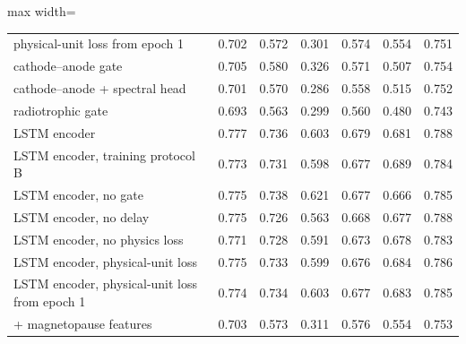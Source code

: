 \begin{table}[!t]
\begin{adjustbox}{max width=\linewidth}
\begin{tabular}{lcccccc}
\quad physical-unit loss from epoch 1 & 0.702 & 0.572 & 0.301 & 0.574 & 0.554 & 0.751 \\
\quad cathode--anode gate & 0.705 & 0.580 & 0.326 & 0.571 & 0.507 & 0.754 \\
\quad cathode--anode + spectral head & 0.701 & 0.570 & 0.286 & 0.558 & 0.515 & 0.752 \\
\quad radiotrophic gate & 0.693 & 0.563 & 0.299 & 0.560 & 0.480 & 0.743 \\
\quad LSTM encoder & 0.777 & 0.736 & 0.603 & 0.679 & 0.681 & 0.788 \\
\quad LSTM encoder, training protocol B & 0.773 & 0.731 & 0.598 & 0.677 & 0.689 & 0.784 \\
\quad LSTM encoder, no gate & 0.775 & 0.738 & 0.621 & 0.677 & 0.666 & 0.785 \\
\quad LSTM encoder, no delay & 0.775 & 0.726 & 0.563 & 0.668 & 0.677 & 0.788 \\
\quad LSTM encoder, no physics loss & 0.771 & 0.728 & 0.591 & 0.673 & 0.678 & 0.783 \\
\quad LSTM encoder, physical-unit loss & 0.775 & 0.733 & 0.599 & 0.676 & 0.684 & 0.786 \\
\quad LSTM encoder, physical-unit loss from epoch 1 & 0.774 & 0.734 & 0.603 & 0.677 & 0.683 & 0.785 \\
\quad + magnetopause features & 0.703 & 0.573 & 0.311 & 0.576 & 0.554 & 0.753 \\
\bottomrule
\end{tabular}
\end{adjustbox}

\par{}
\end{table}
